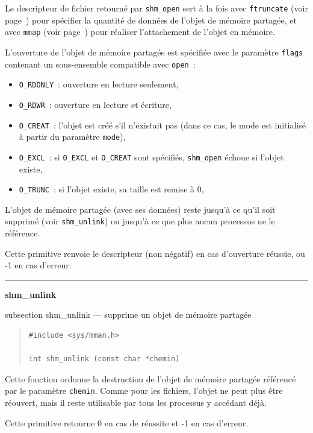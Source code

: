 \documentclass [twoside] {report}
\newcommand {\primitive} [1]
    {
	\phantomsection
	{\large \textbf {#1}}
	\addcontentsline {toc} {subsection} {#1}
    }
\newcommand {\separation}
    {
	\vspace {5mm}
	\nopagebreak
	\hrule
    }
\begin{document}
Le descripteur de fichier retourné par \texttt {shm\_open} sert à
la fois avec \texttt {ftruncate} (voir page~\pageref {ftruncate}) pour
spécifier la quantité de données de l'objet de mémoire partagée,
et avec \texttt {mmap} (voir page~\pageref {mmap}) pour réaliser
l'attachement de l'objet en mémoire.

L'ouverture de l'objet de mémoire partagée est spécifiée avec le
paramètre \texttt {flags} contenant un sous-ensemble compatible avec
\texttt {open}~:

\begin {itemize}
    \item \texttt {O\_RDONLY}~: ouverture en lecture seulement,
    \item \texttt {O\_RDWR}~: ouverture en lecture et écriture,
    \item \texttt {O\_CREAT}~: l'objet est créé s'il n'existait pas
	(dans ce cas, le mode est initialisé à partir du paramètre
	\texttt {mode}),
    \item \texttt {O\_EXCL}~: si \texttt {O\_EXCL} et \texttt {O\_CREAT}
	sont spécifiés, \texttt {shm\_open} échoue si l'objet existe,
    \item \texttt {O\_TRUNC}~: si l'objet existe, sa taille est remise à 0,
\end {itemize}

L'objet de mémoire partagée (avec ses données) reste jusqu'à ce
qu'il soit supprimé (voir \texttt {shm\_unlink}) ou jusqu'à ce que
plus aucun processus ne le référence.

Cette primitive renvoie le descripteur
(non négatif) en cas d'ouverture
réussie, ou -1 en cas d'erreur.


\separation
\primitive {shm\_unlink} --- supprime un objet de mémoire partagée

\begin {quote}
\begin {verbatim}
#include <sys/mman.h>

int shm_unlink (const char *chemin)
\end{verbatim}
\end {quote}

Cette fonction ordonne la destruction de l'objet de mémoire partagée
référencé par le paramètre \texttt {chemin}. Comme pour les fichiers,
l'objet ne peut plus être réouvert, mais il reste utilisable par tous
les processus y accédant déjà.

Cette primitive retourne 0 en cas de réussite
et -1 en cas d'erreur.
\end{document}
